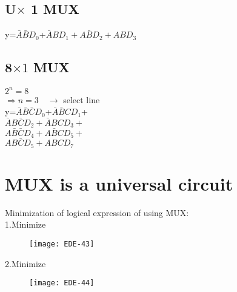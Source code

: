 \subsection{U$\times$ 1 MUX}
	y=$\bar{A}\bar{B}D_0$+$\bar{A}BD_1+A\bar{B}D_2+ABD_3$
\subsection{8$\times 1$ MUX}
$	2^n=8$\\
$\Rightarrow n=3\quad\rightarrow$ select line\\
y=$\bar{A}\bar{B} \bar{C}D_0$+$\bar{A}\bar{B} CD_1$+\\
$\bar{A}B\bar{C}D_2+\bar{A}BCD_3+$\\
$A \bar{B}\bar{C}D_4+A\bar{B}CD_5+$\\
$AB\bar{C}D_5+ABCD_7$
\section{MUX is a universal circuit}
Minimization of logical expression of using MUX:\\
1.\quad  Minimize
\begin{figure}[H]
	\centering
	\texttt{[image: EDE-43]}
\end{figure}
2.\quad  Minimize
\begin{figure}[H]
	\centering
	\texttt{[image: EDE-44]}
\end{figure}
